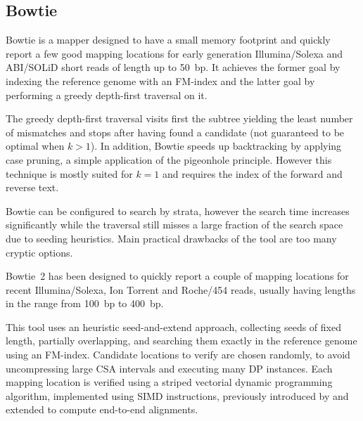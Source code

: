 

\subsection{Bowtie}

Bowtie \citep{Bowtie} is a mapper designed to have a small memory footprint and quickly report a few good mapping locations for early generation Illumina/Solexa and ABI/SOLiD short reads of length up to 50~bp.
It achieves the former goal by indexing the reference genome with an FM-index and the latter goal by performing a greedy depth-first traversal on it.

The greedy depth-first traversal visits first the subtree yielding the least number of mismatches and stops after having found a candidate (not guaranteed to be optimal when $k>1$).
In addition, Bowtie speeds up backtracking by applying case pruning, a simple application of the pigeonhole principle.
However this technique is mostly suited for $k=1$ and requires the index of the forward and reverse text.

Bowtie can be configured to search by strata, however the search time increases significantly while the traversal still misses a large fraction of the search space due to seeding heuristics.
Main practical drawbacks of the tool are too many cryptic options.

Bowtie~2 \citep{Bowtie2} has been designed to quickly report a couple of mapping locations for recent Illumina/Solexa, Ion Torrent and Roche/454 reads, usually having lengths in the range from 100~bp to 400~bp.

This tool uses an heuristic seed-and-extend approach, collecting seeds of fixed length, partially overlapping, and searching them exactly in the reference genome using an FM-index.
Candidate locations to verify are chosen randomly, to avoid uncompressing large CSA intervals and executing many DP instances.
Each mapping location is verified using a striped vectorial dynamic programming algorithm, implemented using SIMD instructions, previously introduced by \citep{Farrar2007} and extended to compute end-to-end alignments.

